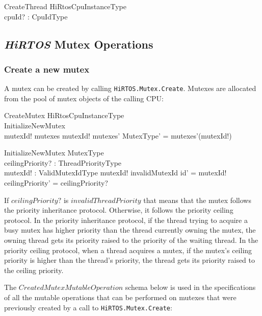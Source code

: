 \documentclass[11pt,letterpaper,twoside,openany]{book}
\begin{document}
\begin{schema}{CreateThread}
   \Delta HiRtosCpuInstanceType \\
   cpuId? : CpuIdType \\
\end{schema}

\subsection{\emph{HiRTOS} Mutex Operations}

\subsubsection{Create a new mutex}

A mutex can be created by calling \verb`HiRTOS.Mutex.Create`. Mutexes are allocated from the pool of
mutex objects of the calling CPU:

\begin{schema}{CreateMutex}
   \Delta HiRtosCpuInstanceType \\
   InitializeNewMutex \\
\where
   mutexId! \notin \dom mutexes
\also
   mutexId! \in \dom mutexes'
\also
   \theta MutexType' = mutexes'(mutexId!)
\end{schema}

\begin{schema}{InitializeNewMutex}
   \Delta MutexType \\
   ceilingPriority? : ThreadPriorityType \\
   mutexId! : ValidMutexIdType
\where
   mutexId! \neq invalidMutexId
\also
   id' = mutexId!
\also
   ceilingPriority' = ceilingPriority?
\end{schema}

If $ceilingPriority?$ is $invalidThreadPriority$ that means that the mutex follows the priority
inheritance protocol. Otherwise, it follows the priority ceiling protocol. In the priority inheritance
protocol, if the thread trying to acquire a busy mutex has higher priority than the thread currently
owning the mutex, the owning thread gets its priority raised to the priority of the waiting thread.
In the priority ceiling protocol, when a thread acquires a mutex, if the mutex's ceiling priority is
higher than the thread's priority, the thread gets its priority raised to the ceiling priority.

The $CreatedMutexMutableOperation$ schema below is used in the specifications of all the mutable
operations that can be performed on mutexes that were previously created by a call to
\verb'HiRTOS.Mutex.Create':
\end{document}

